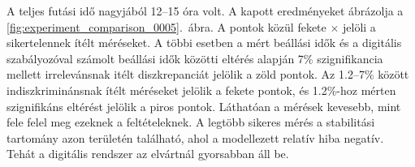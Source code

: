 A teljes futási idő nagyjából 12--15 óra volt. A kapott eredményeket ábrázolja a \ref{fig:experiment_comparison_0005}.~ábra.
A pontok közül fekete $\times$ jelöli a sikertelennek ítélt méréseket. A többi esetben a mért beállási idők és a digitális 
szabályozóval számolt beállási idők közötti eltérés alapján 7\% szignifikancia mellett irrelevánsnak itélt diszkrepanciát 
jelölik a zöld pontok. Az 1.2--7\% között indiszkriminánsnak ítélt méréseket jelölik a fekete pontok, és 1.2\%-hoz mérten 
szignifikáns eltérést jelölik a piros pontok. Láthatóan a mérések kevesebb, mint fele felel meg ezeknek a feltételeknek. 
A legtöbb sikeres mérés a stabilitási tartomány azon területén található, ahol a modellezett relatív hiba negatív. Tehát 
a digitális rendszer az elvártnál gyorsabban áll be. 
